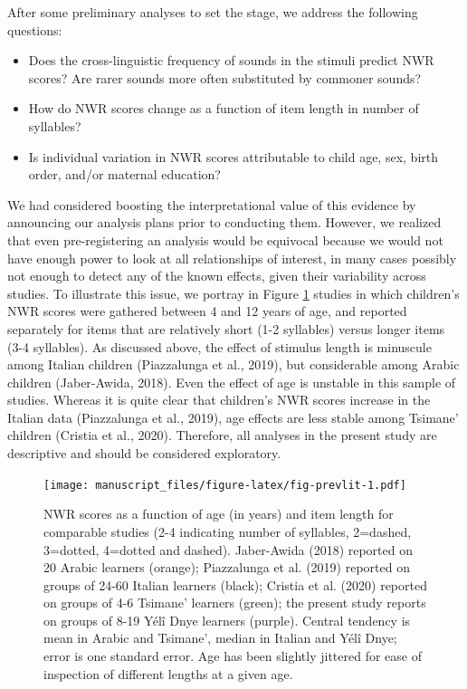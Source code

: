 \documentclass[english,,man,floatsintext]{apa6}
\providecommand{\tightlist}{%
  \setlength{\itemsep}{0pt}\setlength{\parskip}{0pt}}
\begin{document}
After some preliminary analyses to set the stage, we address the following questions:

\begin{itemize}
\tightlist
\item
  Does the cross-linguistic frequency of sounds in the stimuli predict NWR scores? Are rarer sounds more often substituted by commoner sounds?
\item
  How do NWR scores change as a function of item length in number of syllables?
\item
  Is individual variation in NWR scores attributable to child age, sex, birth order, and/or maternal education?
\end{itemize}

We had considered boosting the interpretational value of this evidence by announcing our analysis plans prior to conducting them. However, we realized that even pre-registering an analysis would be equivocal because we would not have enough power to look at all relationships of interest, in many cases possibly not enough to detect any of the known effects, given their variability across studies. To illustrate this issue, we portray in Figure \ref{fig:fig-prevlit} studies in which children's NWR scores were gathered between 4 and 12 years of age, and reported separately for items that are relatively short (1-2 syllables) versus longer items (3-4 syllables). As discussed above, the effect of stimulus length is minuscule among Italian children (Piazzalunga et al., 2019), but considerable among Arabic children (Jaber-Awida, 2018). Even the effect of age is unstable in this sample of studies. Whereas it is quite clear that children's NWR scores increase in the Italian data (Piazzalunga et al., 2019), age effects are less stable among Tsimane' children (Cristia et al., 2020). Therefore, all analyses in the present study are descriptive and should be considered exploratory.

\begin{figure}
\centering
\texttt{[image: manuscript\_files/figure-latex/fig-prevlit-1.pdf]}
\caption{\label{fig:fig-prevlit}NWR scores as a function of age (in years) and item length for comparable studies (2-4 indicating number of syllables, 2=dashed, 3=dotted, 4=dotted and dashed). Jaber-Awida (2018) reported on 20 Arabic learners (orange); Piazzalunga et al. (2019) reported on groups of 24-60 Italian learners (black); Cristia et al. (2020) reported on groups of 4-6 Tsimane' learners (green); the present study reports on groups of 8-19 Yélî Dnye learners (purple). Central tendency is mean in Arabic and Tsimane', median in Italian and Yélî Dnye; error is one standard error. Age has been slightly jittered for ease of inspection of different lengths at a given age.}
\end{figure}
\end{document}
